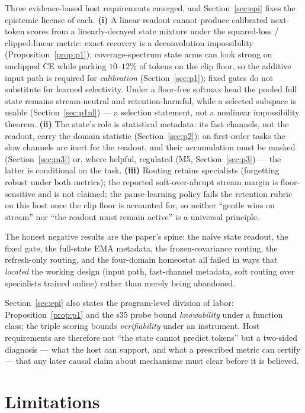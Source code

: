 \documentclass[preprint,12pt]{elsarticle}
\begin{document}
Three evidence-based host requirements emerged, and
Section~\ref{sec:epi} fixes the epistemic license of each.
\textbf{(i)} A linear readout cannot produce calibrated next-token scores from a
linearly-decayed state mixture under the squared-loss / clipped-linear
metric: exact recovery is a deconvolution impossibility
(Proposition~\ref{prop:p1}); coverage-spectrum state arms can look
strong on unclipped CE while parking $10$--$12\%$ of tokens on the clip
floor, so the additive input path is required for \emph{calibration}
(Section~\ref{sec:p1}); fixed gates do not substitute for learned
selectivity. Under a floor-free softmax head the pooled full state
remains stream-neutral and retention-harmful, while a selected
subspace is usable (Section~\ref{sec:p1nl}) --- a selection statement,
not a nonlinear impossibility theorem. \textbf{(ii)} The state's role is statistical metadata:
its fast channels, not the readout, carry the domain statistic
(Section~\ref{sec:p2}); on first-order tasks the slow channels are
inert for the readout, and their accumulation must be masked
(Section~\ref{sec:m3}) or, where helpful, regulated (M5,
Section~\ref{sec:p3}) --- the latter is conditional on the task.
\textbf{(iii)} Routing retains specialists (forgetting robust under
both metrics); the reported soft-over-abrupt stream margin is
floor-sensitive and is not claimed; the pause-learning policy fails
the retention rubric on this host once the clip floor is accounted
for, so neither ``gentle wins on stream'' nor ``the readout must
remain active'' is a universal principle.

The honest negative results are the paper's spine: the naive state
readout, the fixed gate, the full-state EMA metadata, the
frozen-covariance routing, the refresh-only routing, and the four-domain
homeostat all failed in
ways that \emph{located} the working design (input path, fast-channel
metadata, soft routing over specialists trained online) rather than
merely being abandoned.

Section~\ref{sec:epi} also states the program-level division of labor:
Proposition~\ref{prop:p1} and the s35 probe bound \emph{knowability}
under a function class; the triple scoring bounds \emph{verifiability}
under an instrument. Host requirements are therefore not ``the state
cannot predict tokens'' but a two-sided diagnosis --- what the host can
support, and what a prescribed metric can certify --- that any later
causal claim about mechanisms must clear before it is believed.

\section{Limitations}
\label{sec:lim}
\end{document}
